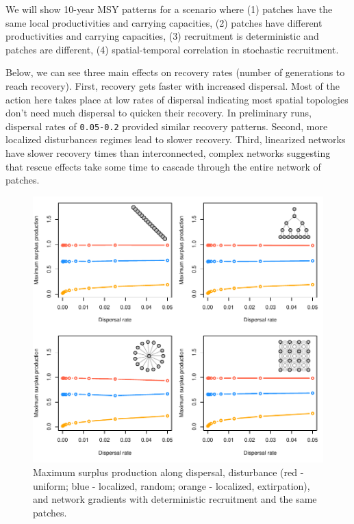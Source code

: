 \documentclass[]{article}
\begin{document}
We will show 10-year MSY patterns for a scenario where (1) patches have
the same local productivities and carrying capacities, (2) patches have
different productivities and carrying capacities, (3) recruitment is
deterministic and patches are different, (4) spatial-temporal
correlation in stochastic recruitment.

Below, we can see three main effects on recovery rates (number of
generations to reach recovery). First, recovery gets faster with
increased dispersal. Most of the action here takes place at low rates of
dispersal indicating most spatial topologies don't need much dispersal
to quicken their recovery. In preliminary runs, dispersal rates of
\texttt{0.05-0.2} provided similar recovery patterns. Second, more
localized disturbances regimes lead to slower recovery. Third,
linearized networks have slower recovery times than interconnected,
complex networks suggesting that rescue effects take some time to
cascade through the entire network of patches.

\begin{figure}[H]

{\centering \includegraphics{Managing_for_ecological_surprises_in_metapopulations_makeHTML_files/figure-latex/MSY-1} 

}

\caption{Maximum surplus production along dispersal, disturbance (red - uniform; blue - localized, random; orange - localized, extirpation), and network gradients with deterministic recruitment and the same patches.}\label{fig:MSY}
\end{figure}
\end{document}
